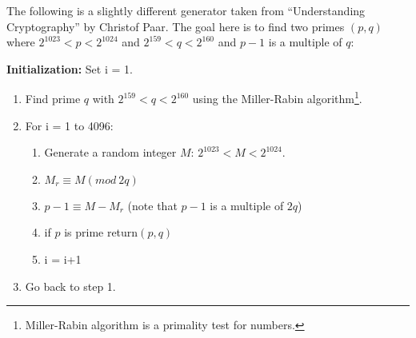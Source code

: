 \documentclass{article}
\begin{document}
	The following is a slightly different generator taken from “Understanding
	Cryptography” by Christof Paar. The goal here is to find two primes $(p, q)$
	where $2^{1023} < p < 2^{1024}$ and $2^{159} < q < 2^{160}$ and $p-1$ is a
	multiple of $q$:

	\renewcommand{\labelenumii}{\arabic{enumi}.\arabic{enumii}.}

	\vspace{10pt}

	\textbf{Initialization:} Set i = 1.

	\begin{enumerate}
		\item Find prime $q$ with $2^{159} < q < 2^{160}$ using the Miller-Rabin
			algorithm\footnote{Miller-Rabin algorithm is a primality test for
			numbers.}.
		\item For i = 1 to 4096:
			\begin{enumerate}
				\item Generate a random integer $M$: $2^{1023} < M < 2^{1024}$.
				\item $M_{r} \equiv M (mod ~ 2q)$
				\item $p-1 \equiv M - M_{r}$ (note that $p-1$ is a multiple of
					$2q$)
				\item if $p$ is prime return$(p, q)$
				\item i = i+1
			\end{enumerate}
		\item Go back to step 1.
	\end{enumerate}
\end{document}
